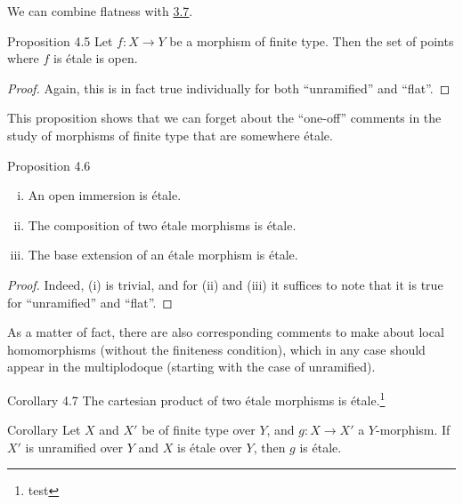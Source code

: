 We can combine flatness with \hyperref[I.3.7]{3.7}.

\begin{itenv}{Proposition 4.5}
\label{I.4.5}
  Let $f\colon X\to Y$ be a morphism of finite type.
  Then the set of points where $f$ is \'{e}tale is open.
\end{itenv}

\begin{proof}
  Again, this is in fact true individually for both ``unramified'' and ``flat''.
\end{proof}

This proposition shows that we can forget about the ``one-off'' comments in the study of morphisms of finite type that are somewhere \'{e}tale.

\begin{itenv}{Proposition 4.6}
\label{I.4.6}
  \begin{enumerate}[(i)]
    \item An open immersion is \'{e}tale.
    \item The composition of two \'{e}tale morphisms is \'{e}tale.
    \item The base extension of an \'{e}tale morphism is \'{e}tale.
  \end{enumerate}
\end{itenv}

\begin{proof}
  Indeed, (i) is trivial, and for (ii) and (iii) it suffices to note that it is true for ``unramified'' and ``flat''.
\end{proof}

As a matter of fact, there are also corresponding comments to make about local homomorphisms (without the finiteness condition), which in any case should appear in the multiplodoque
(starting with the case of unramified).

\begin{itenv}{Corollary 4.7}
\label{I.4.7}
  The cartesian product of two \'{e}tale morphisms is \'{e}tale.\footnote{test}
\end{itenv}

\begin{itenv}{Corollary}
\label{I.4.8}
  Let $X$ and $X'$ be of finite type over $Y$, and $g\colon X\to X'$ a $Y$-morphism.
  If $X'$ is unramified over $Y$ and $X$ is \'{e}tale over $Y$, then $g$ is \'{e}tale.
\end{itenv}

